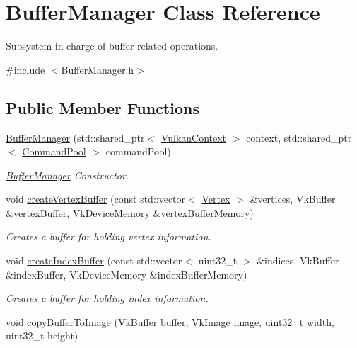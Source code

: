 \hypertarget{class_buffer_manager}{}\section{Buffer\+Manager Class Reference}
\label{class_buffer_manager}


Subsystem in charge of buffer-\/related operations.  




{\ttfamily \#include $<$Buffer\+Manager.\+h$>$}

\subsection*{Public Member Functions}
\begin{DoxyCompactItemize}
\item 
\mbox{\hyperlink{class_buffer_manager_af523fae07b927dafb3f5f3bef5f927ac}{Buffer\+Manager}} (std\+::shared\+\_\+ptr$<$ \mbox{\hyperlink{class_vulkan_context}{Vulkan\+Context}} $>$ context, std\+::shared\+\_\+ptr$<$ \mbox{\hyperlink{class_command_pool}{Command\+Pool}} $>$ command\+Pool)
\begin{DoxyCompactList}\small\item\em \mbox{\hyperlink{class_buffer_manager}{Buffer\+Manager}} Constructor. \end{DoxyCompactList}\item 
void \mbox{\hyperlink{class_buffer_manager_a3cfb02383e977add0d7adc39d81fef5b}{create\+Vertex\+Buffer}} (const std\+::vector$<$ \mbox{\hyperlink{struct_vertex}{Vertex}} $>$ \&vertices, Vk\+Buffer \&vertex\+Buffer, Vk\+Device\+Memory \&vertex\+Buffer\+Memory)
\begin{DoxyCompactList}\small\item\em Creates a buffer for holding vertex information. \end{DoxyCompactList}\item 
void \mbox{\hyperlink{class_buffer_manager_a2807a6d23ffe0b089d50b98508c46982}{create\+Index\+Buffer}} (const std\+::vector$<$ uint32\+\_\+t $>$ \&indices, Vk\+Buffer \&index\+Buffer, Vk\+Device\+Memory \&index\+Buffer\+Memory)
\begin{DoxyCompactList}\small\item\em Creates a buffer for holding index information. \end{DoxyCompactList}\item 
void \mbox{\hyperlink{class_buffer_manager_ab834d6f887011bc0cc715b78e7da2ea0}{copy\+Buffer\+To\+Image}} (Vk\+Buffer buffer, Vk\+Image image, uint32\+\_\+t width, uint32\+\_\+t height)

\end{DoxyCompactItemize}
